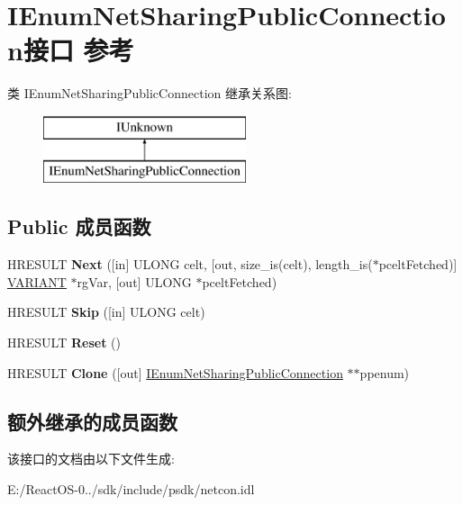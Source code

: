 \hypertarget{interface_i_enum_net_sharing_public_connection}{}\section{I\+Enum\+Net\+Sharing\+Public\+Connection接口 参考}
\label{interface_i_enum_net_sharing_public_connection}
类 I\+Enum\+Net\+Sharing\+Public\+Connection 继承关系图\+:\begin{figure}[H]
\begin{center}
\leavevmode
\includegraphics[height=2.000000cm]{interface_i_enum_net_sharing_public_connection}
\end{center}
\end{figure}
\subsection*{Public 成员函数}
\begin{DoxyCompactItemize}
\item 
\mbox{\label{interface_i_enum_net_sharing_public_connection_a8fcb2dcfac48f24a29841482c79a08f0}} 
H\+R\+E\+S\+U\+LT {\bfseries Next} (\mbox{[}in\mbox{]} U\+L\+O\+NG celt, \mbox{[}out, size\+\_\+is(celt), length\+\_\+is($\ast$pcelt\+Fetched)\mbox{]} \hyperlink{structtag_v_a_r_i_a_n_t}{V\+A\+R\+I\+A\+NT} $\ast$rg\+Var, \mbox{[}out\mbox{]} U\+L\+O\+NG $\ast$pcelt\+Fetched)
\item 
\mbox{\label{interface_i_enum_net_sharing_public_connection_aa435b034aedb85377690a8ca2eb9a7e5}} 
H\+R\+E\+S\+U\+LT {\bfseries Skip} (\mbox{[}in\mbox{]} U\+L\+O\+NG celt)
\item 
\mbox{\label{interface_i_enum_net_sharing_public_connection_a4d6b8c12439534c9f9efce3e51660f2a}} 
H\+R\+E\+S\+U\+LT {\bfseries Reset} ()
\item 
\mbox{\label{interface_i_enum_net_sharing_public_connection_abcce6db7c203b463764792c67cf2156c}} 
H\+R\+E\+S\+U\+LT {\bfseries Clone} (\mbox{[}out\mbox{]} \hyperlink{interface_i_enum_net_sharing_public_connection}{I\+Enum\+Net\+Sharing\+Public\+Connection} $\ast$$\ast$ppenum)
\end{DoxyCompactItemize}
\subsection*{额外继承的成员函数}


该接口的文档由以下文件生成\+:\begin{DoxyCompactItemize}
\item 
E\+:/\+React\+O\+S-\/0../sdk/include/psdk/netcon.\+idl\end{DoxyCompactItemize}
